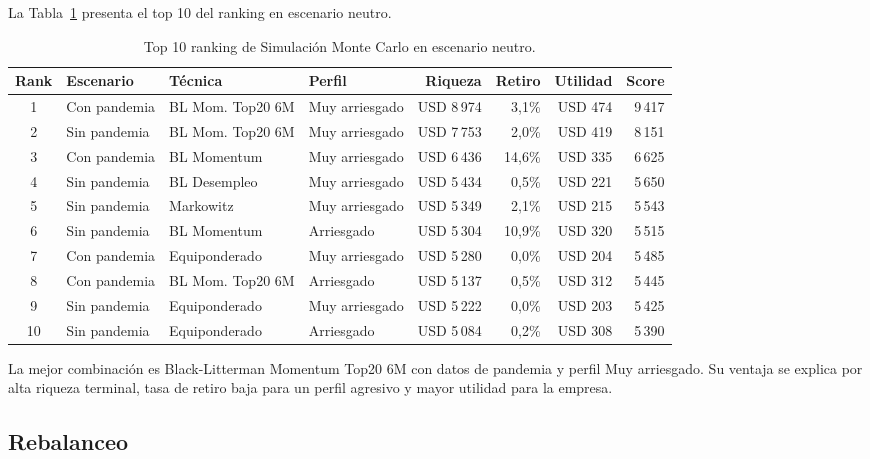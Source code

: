 La Tabla~\ref{tab:anexo4_ranking} presenta el top 10 del ranking en escenario
neutro.

\begin{table}[H]
\centering
\caption{Top 10 ranking de Simulaci\'on Monte Carlo en escenario neutro.}
\label{tab:anexo4_ranking}
\footnotesize
\begin{adjustbox}{max width=\textwidth}
\begin{tabular}{@{}clllrrrr@{}}
\toprule
Rank & Escenario & T\'ecnica & Perfil & Riqueza & Retiro & Utilidad & Score \\
\midrule
1 & Con pandemia & BL Mom. Top20 6M & Muy arriesgado & USD 8\,974 & 3,1\% & USD 474 & 9\,417 \\
2 & Sin pandemia & BL Mom. Top20 6M & Muy arriesgado & USD 7\,753 & 2,0\% & USD 419 & 8\,151 \\
3 & Con pandemia & BL Momentum & Muy arriesgado & USD 6\,436 & 14,6\% & USD 335 & 6\,625 \\
4 & Sin pandemia & BL Desempleo & Muy arriesgado & USD 5\,434 & 0,5\% & USD 221 & 5\,650 \\
5 & Sin pandemia & Markowitz & Muy arriesgado & USD 5\,349 & 2,1\% & USD 215 & 5\,543 \\
6 & Sin pandemia & BL Momentum & Arriesgado & USD 5\,304 & 10,9\% & USD 320 & 5\,515 \\
7 & Con pandemia & Equiponderado & Muy arriesgado & USD 5\,280 & 0,0\% & USD 204 & 5\,485 \\
8 & Con pandemia & BL Mom. Top20 6M & Arriesgado & USD 5\,137 & 0,5\% & USD 312 & 5\,445 \\
9 & Sin pandemia & Equiponderado & Muy arriesgado & USD 5\,222 & 0,0\% & USD 203 & 5\,425 \\
10 & Sin pandemia & Equiponderado & Arriesgado & USD 5\,084 & 0,2\% & USD 308 & 5\,390 \\
\bottomrule
\end{tabular}
\end{adjustbox}
\end{table}

La mejor combinaci\'on es Black-Litterman Momentum Top20 6M con datos de
pandemia y perfil Muy arriesgado. Su ventaja se explica por alta riqueza
terminal, tasa de retiro baja para un perfil agresivo y mayor utilidad para la
empresa.

\subsection*{Rebalanceo}

